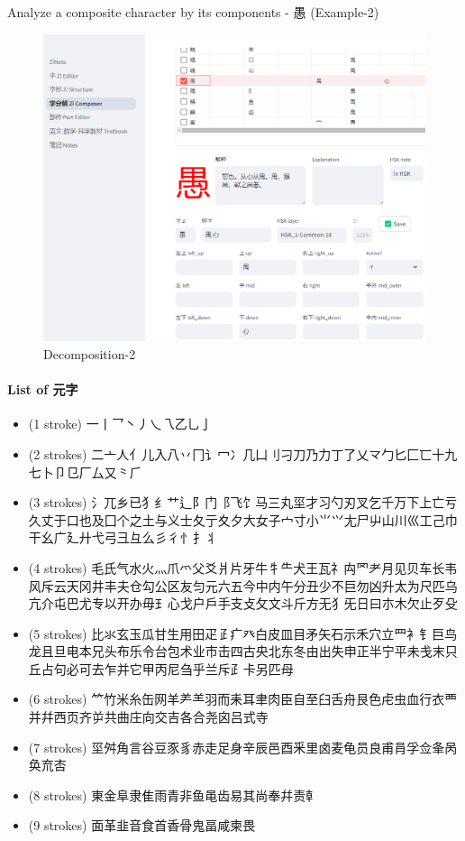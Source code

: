 \documentclass[
  11pt,
  letterpaper,
]{article}
\providecommand{\tightlist}{%
  \setlength{\itemsep}{0pt}\setlength{\parskip}{0pt}}
\begin{document}
Analyze a composite character by its components - 愚 (Example-2)

\begin{figure}
\centering
\includegraphics{./images/app_zi-parts_2.png}
\caption{Decomposition-2}
\end{figure}

\hypertarget{list-of-ux5143ux5b57}{%
\paragraph{List of 元字}\label{list-of-ux5143ux5b57}}

\begin{itemize}
\tightlist
\item
  (1 stroke) 一丨乛丶丿乀乁乙乚亅
\item
  (2 strokes)
  二亠人亻儿入八丷冂讠冖冫几凵刂刁刀乃力丁了乂龴勹匕匚匸十九七卜卩㔾厂厶又⺀⺁
\item
  (3 strokes)
  氵兀乡已犭纟艹辶阝门⻏飞饣马三丸坙才习勺刃叉乞千万下上亡亏久丈于口也及囗个之土与义士夂亍夊夕大女子宀寸小⺌⺍尢尸屮山川巛工己巾干幺广廴廾弋弓彐彑么彡彳忄扌丬
\item
  (4 strokes)
  毛氏气水火灬爪爫父爻爿片牙牛牜⺧犬王瓦礻禸罓耂月见贝车长韦风斥云天冈井丰夫仓勾公区友匀元六五今中内午分丑少不巨勿凶升太为尺匹乌亢介屯巴尤专以开办毋⺩心戈户戶手支攴攵文斗斤方无犭旡日曰朩木欠止歹殳
\item
  (5 strokes)
  比氺玄玉瓜甘生用田疋𤴔疒癶白皮皿目矛矢石示禾穴立罒衤钅巨鸟龙且旦电本兄头布乐令台包术业市击四古央北东冬由出失申正半宁平未戋末只丘占句必可去乍并它甲丙尼刍乎兰斥⺪卡另匹母
\item
  (6 strokes)
  ⺮竹米糸缶网羊⺶⺷羽而耒耳聿肉臣自至臼舌舟艮色虍虫血行衣覀并幷西页齐屰共曲庄向交吉各合尧囟吕式寺
\item
  (7 strokes)
  坙舛角言谷豆豕豸赤走足身辛辰邑酉釆里卤麦龟员良甫肙孚佥夆呙奂㐬㕻
\item
  (8 strokes) 東金阜隶隹雨青非鱼黾齿易其尚奉幷责龺
\item
  (9 strokes) 面革韭音食首香骨鬼畐咸柬畏
\end{itemize}
\end{document}
